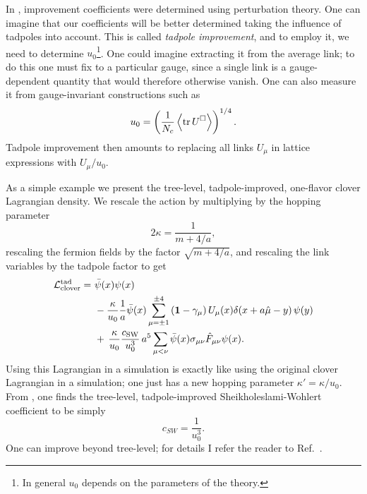 In , improvement coefficients were
determined using perturbation theory. One can imagine that our coefficients
will be better determined taking the influence of tadpoles into account.
This is called {\it tadpole improvement}, and to employ it, we need to
determine $u_0$\footnote{In general $u_0$ depends on the parameters of the
theory.}. One could imagine extracting it from the average link; to do
this one must fix to a particular gauge, since a single link is a
gauge-dependent quantity that would therefore otherwise vanish. One
can also measure it from gauge-invariant constructions such as
\begin{equation}
  u_0=\left(\frac{1}{N_c}\ev{\tr \plaq}\right)^{1/4}.
\end{equation}
Tadpole improvement then amounts to replacing all links $U_\mu$ in lattice
expressions with $U_\mu/u_0$.

As a simple example we present the tree-level, tadpole-improved, one-flavor
clover Lagrangian density. We rescale the action by multiplying by 
the hopping parameter
\begin{equation}
  2\kappa=\frac{1}{m+4/a},
\end{equation}
rescaling the fermion fields by the factor $\sqrt{m+4/a}$, and
rescaling the link variables by the tadpole factor to get
\begin{equation}\begin{aligned}
  \mathcal{L}_\text{clover}^\text{tad}=~&\bar{\psi}(x)\psi(x)\\
    &-\frac{\kappa}{u_0}\frac{1}{a}\bar{\psi}(x)
    \sum_{\mu=\pm1}^{\pm4}\left({\mathbf 1}-\gamma_\mu\right)U_\mu(x)
           \delta(x+a\hat{\mu}-y)\,\psi(y)\\
    &+\,\frac{\kappa}{u_0}\frac{c_\text{SW}}{u_0^3}
               \,a^5\sum_{\mu<\nu}\bar{\psi}(x)
                  \sigma_{\mu\nu}\hat{F}_{\mu\nu}\psi(x).
\end{aligned}\end{equation}
Using this Lagrangian in a simulation is exactly like using the original 
clover Lagrangian in a simulation; one just has a new hopping parameter
$\kappa'=\kappa/u_0$. From , one finds the
tree-level, tadpole-improved Sheikholeslami-Wohlert coefficient to be
simply
\begin{equation}
  c_{SW}=\frac{1}{u_0^3}.
\end{equation}
One can improve beyond tree-level; for details I refer the reader
to Ref.~\cite{degrand_lattice_2006}.



